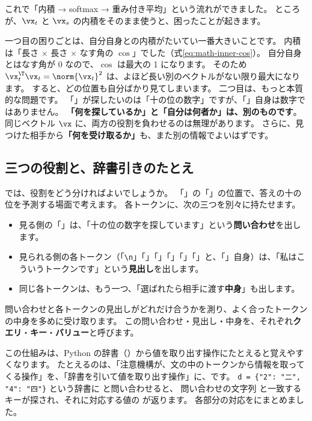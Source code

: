 これで「内積 → softmax → 重み付き平均」という流れができました。
ところが、$\vx_t$ と $\vx_s$ の内積をそのまま使うと、困ったことが起きます。

一つ目の困りごとは、自分自身との内積がたいてい一番大きいことです。
内積は「長さ $\times$ 長さ $\times$ なす角の $\cos$」でした（式\eqref{eq:math-inner-cos}）。
自分自身とはなす角が 0 なので、$\cos$ は最大の 1 になります。
そのため $\vx_t^\T\vx_t = \norm{\vx_t}^2$ は、よほど長い別のベクトルがない限り最大になります。
すると、どの位置も自分ばかり見てしまいます。
二つ目は、もっと本質的な問題です。
「\code{=}」が探したいのは「十の位の数字」ですが、「\code{=}」自身は数字ではありません。
\textbf{「何を探しているか」と「自分は何者か」は、別のものです}。
同じベクトル $\vx$ に、両方の役割を負わせるのは無理があります。
さらに、見つけた相手から\textbf{「何を受け取るか」}も、また別の情報でよいはずです。

\subsection*{三つの役割と、辞書引きのたとえ}

では、役割をどう分ければよいでしょうか。
「」の「\code{=}」の位置で、答えの十の位を予測する場面で考えます。
各トークンに、次の三つを別々に持たせます。
\begin{itemize}
\item 見る側の「\code{=}」は、「十の位の数字を探しています」という\textbf{問い合わせ}を出します。
\item 見られる側の各トークン（「\texttt{\textbackslash n}」「」「」「\code{+}」「」「」と、「\code{=}」自身）は、「私はこういうトークンです」という\textbf{見出し}を出します。
\item 同じ各トークンは、もう一つ、「選ばれたら相手に渡す\textbf{中身}」も出します。
\end{itemize}
問い合わせと各トークンの見出しがどれだけ合うかを測り、よく合ったトークンの中身を多めに受け取ります。
この問い合わせ・見出し・中身を、それぞれ\textbf{クエリ}・\textbf{キー}・\textbf{バリュー}と呼びます。

この仕組みは、Python の辞書（）から値を取り出す操作にたとえると覚えやすくなります。
たとえるのは、「注意機構が、文の中のトークンから情報を取ってくる操作」を、「辞書を引いて値を取り出す操作」に、です。
\texttt{d = \{"2": "二", "4": "四"\}} という辞書に  と問い合わせると、
問い合わせの文字列  と一致するキーが探され、それに対応する値の  が返ります。
各部分の対応をにまとめました。

